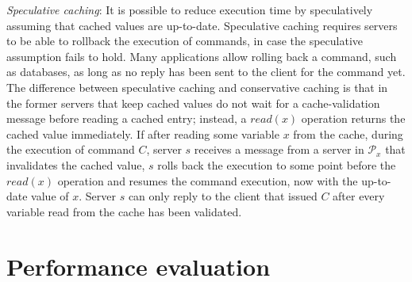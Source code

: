 \documentclass[11pt]{article}
\newcommand{\ppm}{\mathcal{P}}
\begin{document}
\emph{Speculative caching}: It is possible to reduce execution time by speculatively assuming that cached values are up-to-date. 
Speculative caching requires servers to be able to rollback the execution of commands, in case the speculative assumption fails to hold. 
Many applications allow rolling back a command, such as databases, as long as no reply has been sent to the client for the command yet. 
The difference between speculative caching and conservative caching is that in the former servers that keep cached values do not wait for a cache-validation message before reading a cached entry; instead, a $read(x)$ operation returns the cached value immediately. 
If after reading some variable $x$ from the cache, during the execution of command $C$, server $s$ receives a message from a server in $\ppm_x$ that invalidates the cached value, $s$ rolls back the execution to some point before the $read(x)$ operation and resumes the command execution, now with the up-to-date value of $x$. 
Server $s$ can only reply to the client that issued $C$ after every variable read from the cache has been validated.



\section{Performance evaluation}
\end{document}
